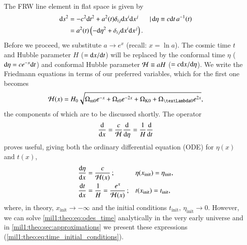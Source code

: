 

The FRW line element in flat space is given by
\begin{equation}\label{mil1:theo:eq:FRW}
    \begin{split}
        \D s^2 &= -c^2\D t^2 + a^2(t) \delta_{ij} \D x^i \D x^j && |\, \D \eta \equiv c\D t\, a^{-1}(t) \\%
                &= a^2(t) \left( -\D \eta^2 + \delta_{ij} \D x^i \D x^j \right).
    \end{split}
\end{equation}
Before we proceed, we substitute $a\to e^x$ (recall: $x=\ln{a}$). The cosmic time $t$ and Hubble parameter $H$ ($=\mathrm{d} x/\mathrm{d} t$) will be replaced by the conformal time $\eta$ ($\mathrm{d} \eta = ce^{-x}\mathrm{d} t$) and conformal Hubble parameter $\mathcal{H}\equiv aH$ ($=c\mathrm{d} x/\mathrm{d} \eta$). We write the Friedmann equations in terms of our preferred variables, which for the first one becomes
\begin{equation}\label{mil1:theo:eq:Hp_of_x}
    \Hp(x) = H_0 \sqrt{\OmgM e^{-x} + \OmgR e^{-2x}  + \OmgK + \OmgL e^{2x}},
\end{equation}
the components of which are to be discussed shortly. The operator 
\begin{equation}
    \frac{\mathrm{d}}{\mathrm{d} x} = \frac{c}{\mathcal{H}} \frac{\mathrm{d}}{\mathrm{d} \eta} = \frac{1}{H} \frac{\mathrm{d}}{\mathrm{d} t}
\end{equation}
proves useful, giving both the ordinary differential equation (ODE) for $\eta(x)$ and $t(x)$,
\begin{subequations}\label{mil1:theo:eq:odes_time}
    \begin{align}
        \frac{\mathrm{d} \eta}{\mathrm{d} x} &= \frac{c}{\mathcal{H}(x)}\,; &&  \eta(x_\mathrm{init}) = \eta_\mathrm{init} ,\label{mi1:theo:eq:ode_eta_of_x}\\
        \frac{\mathrm{d} t}{\mathrm{d} x} &= \frac{1}{H} = \frac{e^x}{\mathcal{H}(x)}\,; && t(x_\mathrm{init}) = t_\mathrm{init},\label{mi1:theo:eq:ode_t_of_x}
    \end{align}
\end{subequations}
where, in theory, $x_\mathrm{init}\to -\infty$ and the initial conditions $t_\mathrm{init},\, \eta_\mathrm{init} \to 0$. However, we can solve \cref{mil1:theo:eq:odes_time} analytically in the very early universe and in \cref{mil1:theo:sec:approximations} we present these expressions (\cref{mil1:theo:eq:time_initial_conditions}).

